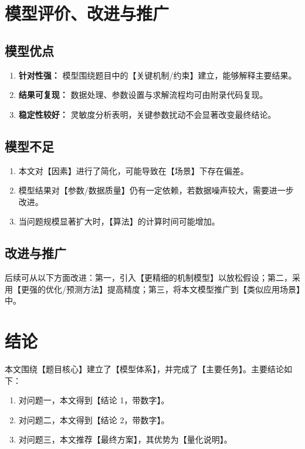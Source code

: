 \documentclass{cumcmthesis}
\begin{document}
\section{模型评价、改进与推广}

\subsection{模型优点}
\begin{enumerate}
  \item \textbf{针对性强：} 模型围绕题目中的【关键机制/约束】建立，能够解释主要结果。
  \item \textbf{结果可复现：} 数据处理、参数设置与求解流程均可由附录代码复现。
  \item \textbf{稳定性较好：} 灵敏度分析表明，关键参数扰动不会显著改变最终结论。
\end{enumerate}

\subsection{模型不足}
\begin{enumerate}
  \item 本文对【因素】进行了简化，可能导致在【场景】下存在偏差。
  \item 模型结果对【参数/数据质量】仍有一定依赖，若数据噪声较大，需要进一步改进。
  \item 当问题规模显著扩大时，【算法】的计算时间可能增加。
\end{enumerate}

\subsection{改进与推广}
后续可从以下方面改进：第一，引入【更精细的机制模型】以放松假设；第二，采用【更强的优化/预测方法】提高精度；第三，将本文模型推广到【类似应用场景】中。

\section{结论}
本文围绕【题目核心】建立了【模型体系】，并完成了【主要任务】。主要结论如下：
\begin{enumerate}
  \item 对问题一，本文得到【结论 1，带数字】。
  \item 对问题二，本文得到【结论 2，带数字】。
  \item 对问题三，本文推荐【最终方案】，其优势为【量化说明】。
\end{enumerate}
\end{document}
